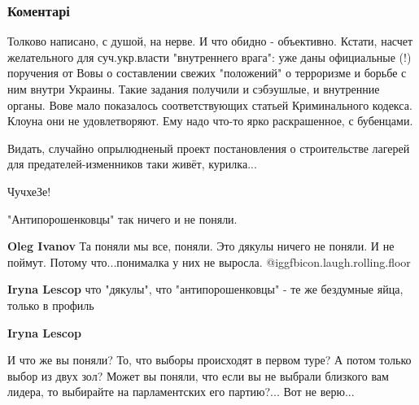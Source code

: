  
 
 
 
 
\subsubsection{Коментарі}
\label{sec:31_12_2020.fb.lesev_igor.1.on_nash_prigovor.cmt}

\begin{itemize} %

Толково написано, с душой, на нерве. И что обидно - объективно. Кстати, насчет
желательного для суч.укр.власти "внутреннего врага": уже даны официальные (!)
поручения от Вовы о составлении свежих "положений" о терроризме и борьбе с ним
внутри Украины. Такие задания получили и сэбэушлые, и внутренние органы. Вове
мало показалось соответствующих статьей Криминального кодекса. Клоуна они не
удовлетворяют. Ему надо что-то ярко раскрашенное, с бубенцами.

Видать, случайно опрылюдненый проект постановления о строительстве лагерей для предателей-изменников таки живёт, курилка...

ЧучхеЗе!

"Антипорошенковцы" так ничего и не поняли.

\begin{itemize} %
\textbf{Oleg Ivanov} Та поняли мы все, поняли. Это дякулы ничего не поняли. И не поймут. Потому что...понималка у них не выросла.  @igg{fbicon.laugh.rolling.floor} 

\textbf{Iryna Lescop} что "дякулы", что "антипорошенковцы" - те же бездумные яйца, только в профиль

\textbf{Iryna Lescop} 

И что же вы поняли? То, что выборы происходят в первом туре? А потом только выбор
из двух зол? Может вы поняли, что если вы не выбрали близкого вам лидера, то
выбирайте на парламентских его партию?... Вот не верю...

\end{itemize} %



\end{itemize}
